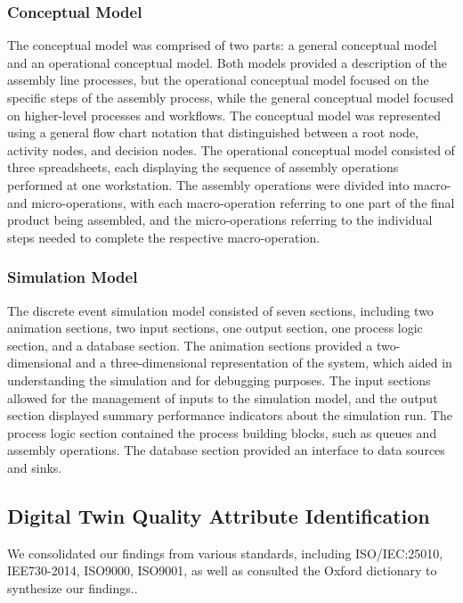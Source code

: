 \documentclass{llncs}
\begin{document}
    \subsubsection*{Conceptual Model}
    The conceptual model was comprised of two parts:  a general conceptual model and an operational conceptual model. Both models provided a description of the assembly line processes, but the operational conceptual model focused on the specific steps of the assembly process, while the general conceptual model focused on higher-level processes and workflows.
    The conceptual model was represented using a general flow chart notation that distinguished between a root node, activity nodes, and decision nodes.
    The operational conceptual model consisted of three spreadsheets, each displaying the sequence of assembly operations performed at one workstation. The assembly operations were divided into macro- and micro-operations, with each macro-operation referring to one part of the final product being assembled, and the micro-operations referring to the individual steps needed to complete the respective macro-operation.
    \subsubsection*{Simulation Model}
    The discrete event simulation model consisted of seven sections, including two animation sections, two input sections, one output section, one process logic section, and a database section. The animation sections provided a two-dimensional and a three-dimensional representation of the system, which aided in understanding the simulation and for debugging purposes. The input sections allowed for the management of inputs to the simulation model, and the output section displayed summary performance indicators about the simulation run. 
    The process logic section contained the process building blocks, such as queues and assembly operations. The database section provided an interface to data sources and sinks.

    \subsection{Digital Twin Quality Attribute Identification}
    We consolidated our findings from various standards, including ISO/IEC:25010, 
    IEE730-2014, ISO9000, ISO9001, as well as consulted the  Oxford dictionary to synthesize our findings\cite{ISO9000,ISO90012015,ISO/IEC:25010,IEE730-2014,OxfordDictionary}..
\end{document}
